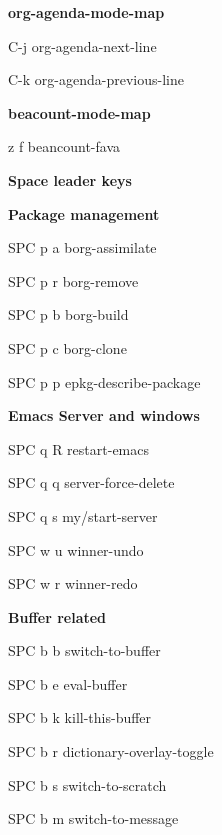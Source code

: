 \documentclass[10pt]{article}
\renewcommand\section[1]{\bigskip\par\textbf{\color{heading}\large#1}\smallskip}
\renewcommand\subsection[1]{\smallskip\par\textbf{\color{heading}#1}}
\begin{document}
\begin{multicols}{4}
  \subsection{org-agenda-mode-map}
  \begin{keylist}
    \item[C-j] org-agenda-next-line
    \item[C-k] org-agenda-previous-line
  \end{keylist}

  \subsection{beacount-mode-map}
  \begin{keylist}
    \item[z f] beancount-fava
  \end{keylist}


  \section{Space leader keys}
  \subsection{Package management}
  \begin{keylist}
    \item[SPC p a] borg-assimilate
    \item[SPC p r] borg-remove
    \item[SPC p b] borg-build
    \item[SPC p c] borg-clone
    \item[SPC p p] epkg-describe-package
  \end{keylist}

  \section{Emacs Server and windows}
  \begin{keylist}
    \item[SPC q R] restart-emacs
    \item[SPC q q] server-force-delete
    \item[SPC q s] my/start-server
    \item[SPC w u] winner-undo
    \item[SPC w r] winner-redo
  \end{keylist}

  \subsection{Buffer related}
  \begin{keylist}
    \item[SPC b b] switch-to-buffer
    \item[SPC b e] eval-buffer
    \item[SPC b k] kill-this-buffer
    \item[SPC b r] dictionary-overlay-toggle
    \item[SPC b s] switch-to-scratch
    \item[SPC b m] switch-to-message
  \end{keylist}


\end{multicols}
\end{document}
